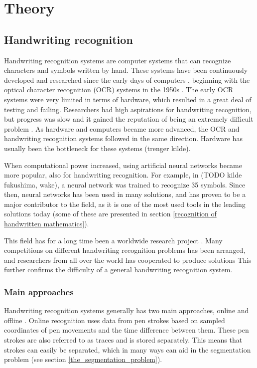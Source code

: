 \chapter{Theory}

\section{Handwriting recognition}
% 
Handwriting recognition systems are computer systems that can recognize characters and symbols written by hand. These systems have been continuously developed and researched since the early days of computers \parencite{simon_off-line_1992}, beginning with the optical character recognition (OCR) systems in the 1950s \parencite{mori_historical_1992}. The early OCR systems were very limited in terms of hardware, which resulted in a great deal of testing and failing. Researchers had high aspirations for handwriting recognition, but progress was slow and it gained the reputation of being an extremely difficult problem \parencite{simon_off-line_1992}. As hardware and computers became more advanced, the OCR and handwriting recognition systems followed in the same direction. Hardware has usually been the bottleneck for these systems (trenger kilde).

When computational power increased, using artificial neural networks became more popular, also for handwriting recognition. For example, in (TODO kilde fukushima, wake), a neural network was trained to recognize 35 symbols. Since then, neural networks has been used in many solutions, and has proven to be a major contributor to the field, as it is one of the most used tools in the leading solutions today (some of these are presented in section \ref{recognition of handwritten mathematics}).

This field has for a long time been a worldwide research project \parencite{mori_historical_1992}. Many competitions on different handwriting recognition problems has been arranged, and researchers from all over the world has cooperated to produce solutions This further confirms the difficulty of a general handwriting recognition system. 

\subsection{Main approaches}

Handwriting recognition systems generally has two main approaches, online and offline \parencite{priya_online_2016}. Online recognition uses data from pen strokes based on sampled coordinates of pen movements and the time difference between them. These pen strokes are also referred to as traces and is stored separately. This means that strokes can easily be separated, which in many ways can aid in the segmentation problem (see section \ref{the_segmentation_problem}).

